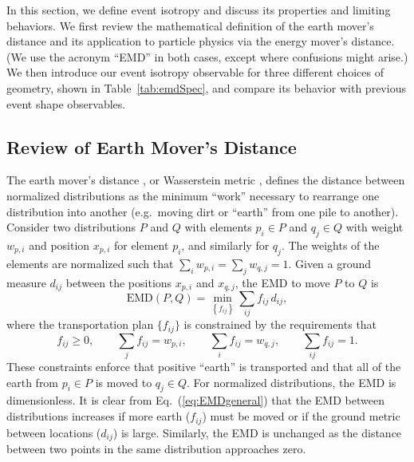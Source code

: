 \documentclass[letterpaper,11pt]{article}
\DeclareRobustCommand{\Tab}[1]{Table~\ref{#1}}
\DeclareRobustCommand{\Eq}[1]{Eq.~(\ref{#1})}
\begin{document}
In this section, we define event isotropy and discuss its properties and limiting behaviors. 
%
We first review the mathematical definition of the earth mover's distance and its application to particle physics via the energy mover's distance.
%
(We use the acronym ``EMD'' in both cases, except where confusions might arise.)
%
We then introduce our event isotropy observable for three different choices of geometry, shown in \Tab{tab:emdSpec}, and compare its behavior with previous event shape observables.


\subsection{Review of Earth Mover's Distance}

The earth mover's distance \cite{Peleg1989AUA, Rubner:1998:MDA:938978.939133,Rubner2000,Pele2008ALT,Pele2013TheTE}, or Wasserstein metric \cite{wasserstein1969markov}, defines the distance between normalized distributions as the minimum ``work'' necessary to rearrange one distribution into another (e.g.\ moving dirt or ``earth'' from one pile to another). 
%
Consider two distributions $P$ and $Q$ with elements $p_i \in P$ and $q_j \in Q$ with weight $w_{p,i}$ and position $x_{p,i}$ for element $p_i$, and similarly for $q_j$.
%
The weights of the elements are normalized such that $\sum_{i} w_{p,i}= \sum_{j} w_{q,j} = 1$.
%
Given a ground measure $d_{ij}$ between the positions $x_{p,i}$ and $x_{q,j}$, the EMD to move $P$ to $Q$ is
%
\begin{equation}
\label{eq:EMDgeneral}
\text{EMD}(P, Q) = \min \limits_{\left\{ f_{ij} \right\}} \sum_{i j} f_{ij} \, d_{ij},
\end{equation}
%
where the transportation plan $\{f_{ij}\}$ is constrained by the requirements that
%
\begin{equation}
f_{ij} \geq 0, \qquad \sum_{j} f_{ij} = w_{p,i}, \qquad \sum_{i} f_{ij} = w_{q,j}, \qquad \sum_{i j} f_{ij} = 1.
\end{equation}
%
These constraints enforce that positive ``earth'' is transported and that all of the earth from $p_i \in P$ is moved to $q_j \in Q$.
%
For normalized distributions, the EMD is dimensionless. 
%
It is clear from \Eq{eq:EMDgeneral} that the EMD between distributions increases if more earth ($f_{ij}$) must be moved or if the ground metric between locations ($d_{ij}$) is large. 
%
Similarly, the EMD is unchanged as the distance between two points in the same distribution approaches zero.
\end{document}
